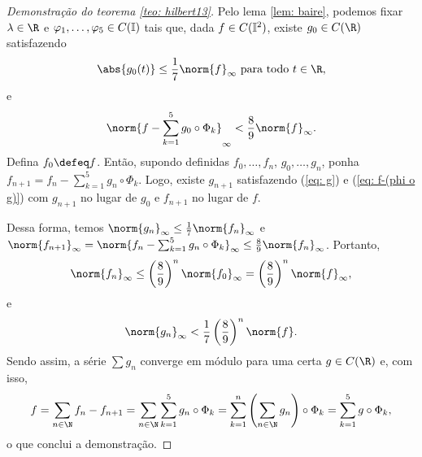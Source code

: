 \begin{proof}[Demonstração do teorema \ref{teo: hilbert13}]
    Pelo lema \ref{lem: baire}, podemos fixar \( \lambda \in \R \) e \( \varphi_{ 1 }, \dots, \varphi_{ 5 } \in C(\mathbb{I}) \) tais que, dada \( f \in C(\mathbb{I}^2) \), existe \( g_{ 0 } \in C(\R) \) satisfazendo
    \begin{equation}
        \abs{ g_{ 0 }(t) } \leq \frac{ 1 }{ 7 } \norm{ f }_{ \infty } \text{ para todo } t \in \R
        \label{eq: g}
    ,\end{equation}
    e
    \begin{equation}
        \norm{ 
            f -
            \sum_{ k=1 }^{ 5 } g_{ 0 } \circ \Phi_{ k }
         }_{ \infty }
         < \frac{ 8 }{ 9 } \norm{ f }_{ \infty }
         \label{eq: f-(phi o g)}
    .\end{equation}
    Defina \( f_{ 0 } \defeq f \). Então, supondo definidas \( f_{ 0 }, \dots, f_{ n } \), \( g_{ 0 }, \dots, g_{ n } \), ponha \( f_{ n+1 } = f_{ n } - \sum_{ k=1 }^{ 5 } g_{ n } \circ \Phi_{ k } \).
    Logo, existe \( g_{ n+1 } \) satisfazendo (\ref{eq: g}) e (\ref{eq: f-(phi o g)}) com \( g_{ n+1 } \) no lugar de \( g_{ 0 } \) e \( f_{ n+1 } \) no lugar de \( f \).
    
    Dessa forma, temos \( \norm{ g_{ n } }_{ \infty } \leq \frac{ 1 }{ 7 } \norm{ f_{ n } }_{ \infty } \) e \( \norm{ f_{ n+1 } }_{ \infty } = \norm{ f_{ n } - \sum_{ k=1 }^{ 5 } g_{ n } \circ \Phi_{ k } }_{ \infty } \leq \frac{ 8 }{ 9 } \norm{ f_{ n } }_{ \infty } \).
    Portanto, \[
        \norm{ f_{ n } }_{ \infty } \leq \left( \frac{ 8 }{ 9 } \right)^{ n } \norm{ f_{ 0 } }_{ \infty } = \left( \frac{ 8 }{ 9 } \right)^{ n } \norm{ f }_{ \infty }
    ,\]
    e \[
        \norm{ g_{ n } }_{ \infty } <
        \frac{ 1 }{ 7 } \left( \frac{ 8 }{ 9 } \right)^{ n } \norm{ f }
    .\]
    Sendo assim, a série \( \sum g_{ n } \) converge em módulo para uma certa \( g \in C(\R) \) e, com isso, \[
        f = \sum_{ n\in\N } f_{ n } - f_{ n+1 }
        = \sum_{ n\in\N } \sum_{ k=1 }^{ 5 } g_{ n } \circ \Phi_{ k }
        = \sum_{ k=1 }^{ n } \left( 
            \sum_{ n\in\N } g_{ n }
         \right)
         \circ \Phi_{ k }
        = \sum_{ k=1 }^{ 5 } g \circ \Phi_{ k }
    ,\]
    o que conclui a demonstração.
\end{proof}